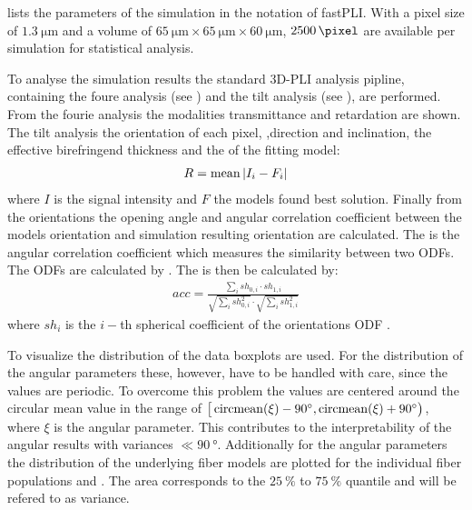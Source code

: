 % 
 lists the parameters of the simulation in the notation of \ac{fastPLI}.
With a pixel size of $\SI{1.3}{\micro\meter}$ and a volume of $\SI{65}{\micro\meter} \times \SI{65}{\micro\meter} \times \SI{60}{\micro\meter}$, $\SI{2500}{\pixel}$ are available per simulation for statistical analysis.
\par
% 
To analyse the simulation results the standard \ac{3D-PLI} analysis pipline, containing the foure analysis (see \dummy{}) and the tilt analysis (see \dummy{}), are performed.
From the fourie analysis the modalities transmittance and retardation are shown.
The tilt analysis \dummy{} the orientation of each pixel, \ie{},direction and inclination, the effective birefringend thickness \trel{} and the \rvalue{} of the fitting model:
\begin{align}
    R = \operatorname{mean}{|I_i-F_i|} \label{eq:rvalue}
\end{align}
where $I$ is the signal intensity and $F$ the models found best solution.
Finally from the orientations the opening angle \openingAngle{} and angular correlation coefficient \accvalue{} between the models orientation and simulation resulting orientation are calculated.
The \accvalue{} is the angular correlation coefficient which measures the similarity between two \acp{ODF}. The \acp{ODF} are calculated by \dummy{}.
The \accvalue{} is then be calculated by:
\begin{align}
    acc = \frac{\sum_i{\mathit{sh}_{0,i} \cdot \mathit{sh}_{1,i}}}{\sqrt{\sum_i{\mathit{sh}_{0,i}^2}} \cdot \sqrt{\sum_i{\mathit{sh}_{1,i}^2}}}
\end{align}
where $\mathit{sh}_i$ is the $i-$th spherical coefficient of the orientations \ac{ODF} \cite{Schilling2018}.
\par
%
To visualize the distribution of the data boxplots are used.
For the distribution of the angular parameters these, however, have to be handled with care, since the values are periodic.
To overcome this problem the values are centered around the circular mean value in the range of $\big[\operatorname{circmean} (\xi)-\SI{90}{\degree}, \operatorname{circmean}(\xi)+\SI{90}{\degree}\big)$, where $\xi$ is the angular parameter.
This contributes to the interpretability of the angular results with variances $\ll \SI{90}{\degree}$.
Additionally for the angular parameters the distribution of the underlying fiber models are plotted for the individual fiber populations \popa{} and \popb{}.
The area corresponds to the $\SI{25}{\percent}$ to $\SI{75}{\percent}$ quantile and will be refered to as \bvariance{} variance.
% 
% 
% 
